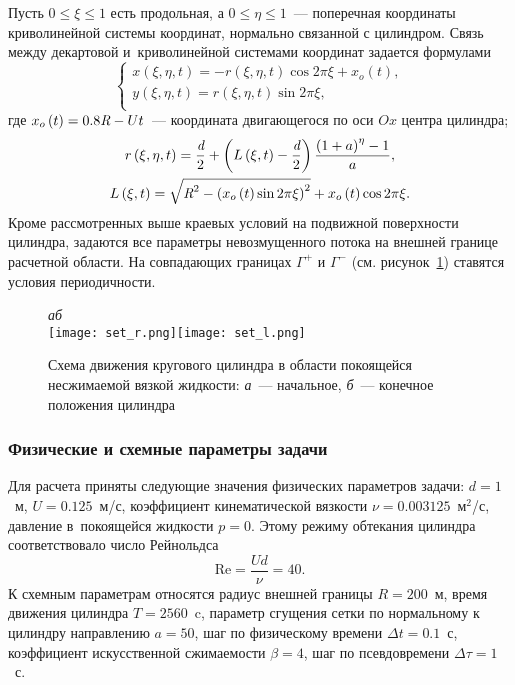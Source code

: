 Пусть $0\leq \xi\leq 1$ есть продольная, а $0\leq \eta\leq 1$~--- поперечная координаты криволинейной системы 
координат, нормально связанной с цилиндром. Связь между декартовой и~криволинейной системами координат 
задается формулами
\begin{equation}
  \left\{
  \begin{array}{l}
  x\left( {\xi ,\eta ,t} \right) =  - r\left( {\xi ,\eta ,t} \right)\cos 2\pi\xi  + x_o \left( t \right), \\
  y\left( {\xi ,\eta ,t} \right) =    r\left( {\xi ,\eta ,t} \right)\sin 2\pi\xi , \\
  \end{array} \right.
\end{equation}
где $x_o \left( t \right) = 0.8\emph{R} - U  t$~--- координата двигающегося по оси $Ox$ центра цилиндра;
\begin{gather*}
  r\left( {\xi ,\eta ,t} \right) = \frac{\emph{d}}{2} + \left(
  {L\left( {\xi ,t} \right) - \frac{\emph{d}}{2}}
  \right)\frac{{\left( {1 + a} \right)^\eta - 1}}{a}, \\
  L\left( {\xi ,t} \right) = \sqrt {\emph{R}^2  - \left( {x_o
  \left( t \right)\sin 2\pi\xi } \right)^2 }  + x_o \left( t
  \right)\cos 2\pi\xi.
\end{gather*}
Кроме рассмотренных выше краевых условий на подвижной поверхности цилиндра, задаются все параметры 
невозмущенного потока на внешней границе расчетной области. На совпадающих границах $\Gamma^+$ и
$\Gamma^-$ (см. рисунок~\ref{fig1:3}) ставятся условия периодичности.
\begin{figure}[!t]
  \label{fig1:3}
  \centering\small \emph{а}\hspace*{81mm}\emph{б}\\
  \texttt{[image: set\_r.png]}\hspace*{20mm}\texttt{[image: set\_l.png]}
  \caption{Схема движения кругового цилиндра в области покоящейся несжимаемой вязкой жидкости: \emph{а}~--- 
           начальное, \emph{б}~--- конечное положения цилиндра}
\end{figure}

\subsubsection{Физические и схемные параметры задачи}
\label{s:1522}
Для расчета приняты следующие значения физических параметров задачи: $d=1$~м, $U=0.125$~м/с, коэффициент 
кинематической вязкости $\nu=0.003125$~м$^2$/с, давление в~покоящейся жидкости $p=0$. Этому режиму обтекания 
цилиндра соответствовало число Рейнольдса
\begin{equation*}
\mathrm{Re}=\frac{U  d}{\nu}=40.
\end{equation*}
К схемным параметрам относятся радиус внешней границы $R=200$~м, время движения цилиндра $T=2560$~c, параметр 
сгущения сетки по нормальному к цилиндру направлению $a=50$, шаг по физическому времени $\Delta t=0.1$~с, 
коэффициент искусственной сжимаемости $\beta=4$, шаг по псевдовремени $\Delta\tau=1$~с.

